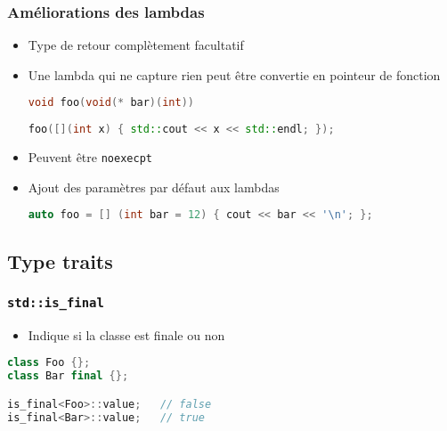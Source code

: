 \documentclass[C++.tex]{subfiles}
\begin{document}
\begin{frame}[fragile]
	\frametitle{Améliorations des lambdas}
	\begin{itemize}
		\item Type de retour complètement facultatif


		\item Une lambda qui ne capture rien peut être convertie en pointeur de fonction


\begin{lstlisting}[language=C++]
void foo(void(* bar)(int))
		
foo([](int x) { std::cout << x << std::endl; });\end{lstlisting}

		\item Peuvent être \lstinline|noexecpt|
		\item Ajout des paramètres par défaut aux lambdas
	
		\begin{lstlisting}[language=C++]
auto foo = [] (int bar = 12) { cout << bar << '\n'; };\end{lstlisting}
	\end{itemize}
\end{frame}

\subsection*{Type traits}
\begin{frame}[fragile]
	\frametitle{\lstinline|std::is_final|}
	\begin{itemize}
		\item Indique si la classe est finale ou non
	\end{itemize}

	\begin{lstlisting}[language=C++]
class Foo {};
class Bar final {};

is_final<Foo>::value;   // false
is_final<Bar>::value;   // true\end{lstlisting}
\end{frame}
\end{document}
